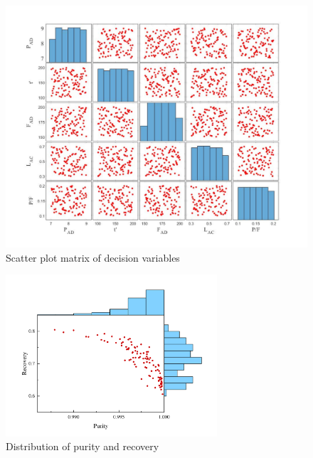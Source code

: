 \documentclass[preprint,12pt]{elsarticle}
\begin{document}
\begin{figure}
	\centering
	\includegraphics[width=1\textwidth]{figs/Fig4.pdf}
	\caption{Scatter plot matrix of decision variables}
	\label{FIG:4}
\end{figure}
\begin{figure}
	\centering
	\includegraphics[width=0.7\textwidth]{figs/Fig5.pdf}
	\caption{Distribution of purity and recovery}
	\label{FIG:5}
\end{figure}
\end{document}
